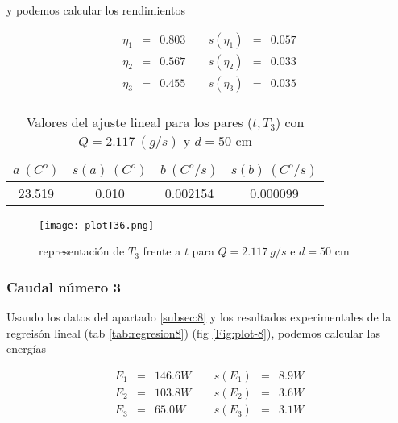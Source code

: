 \documentclass[12pt,a4paper]{article}
\begin{document}
 y podemos calcular los rendimientos 
 
\begin{equation} 
\begin{array}{lllllll}
\eta_1 & = & 0.803  &  \ \ &  s(\eta_1) & =  & 0.057   \\ 
 \eta_2 & = & 0.567  &  \ \ &  s(\eta_2) & =  & 0.033   \\ 
 \eta_3 & = & 0.455  &  \ \ &  s(\eta_3) & =  & 0.035   \\ 
 \end{array} 
\end{equation} 
 
 \begin{table}[h!] 	 \centering 
\begin{tabular}{|c|c|c|c|} 
\hline 
$a \ (C^o)$ & $s(a) \ (C^o)$ & $ b \ (C^o/s)$ & $s(b) \ (C^o/s)$  \\ \hline 
23.519  & 0.010 &  0.002154 & 0.000099 \\ 
\hline
\end{tabular} 
\caption{Valores del ajuste lineal para los pares ($t,T_3$) con $Q=2.117 \ (g/s)$ y $d= 50 $ cm} 
\label{tab:regresion7} 
\end{table} 
 
 
\begin{figure}[h!] 	 \centering 
\texttt{[image: plotT36.png]} 
\caption{representación de $T_3$ frente a $t$ para $Q = 2.117 \ g/s$ e $d = 50$ cm} 
\label{Fig:plot-7}  
\end{figure} 
 
\newpage 
 
 
 
 
\subsubsection{Caudal número 3} 
 
Usando los datos del apartado \ref{subsec:8} y los  resultados experimentales de la regreisón lineal (tab \ref{tab:regresion8}) (fig \ref{Fig:plot-8}), podemos calcular las energías 
 
 \begin{equation} 
\begin{array}{lllllll}
E_1 & = & 146.6 W &  \ \ &  s(E_1) & =  & 8.9  W \\ 
 E_2 & = & 103.8 W &  \ \ &  s(E_2) & =  & 3.6  W \\ 
 E_3 & = & 65.0 W &  \ \ &  s(E_3) & =  & 3.1  W \\ 
 \end{array} 
\end{equation} 
 
\end{document}

